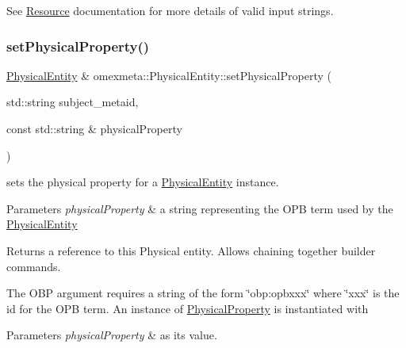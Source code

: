 See \hyperlink{classomexmeta_1_1Resource}{Resource} documentation for more details of valid input strings. \mbox{\label{classomexmeta_1_1PhysicalEntity_a5d7168c527d2dbdacd612de37aa9a605}} 
\subsubsection{\texorpdfstring{set\+Physical\+Property()}{setPhysicalProperty()}\hspace{0.1cm}{\footnotesize\ttfamily [1/2]}}
{\footnotesize\ttfamily \hyperlink{classomexmeta_1_1PhysicalEntity}{Physical\+Entity} \& omexmeta\+::\+Physical\+Entity\+::set\+Physical\+Property (\begin{DoxyParamCaption}\item[{std\+::string}]{subject\+\_\+metaid,  }\item[{const std\+::string \&}]{physical\+Property }\end{DoxyParamCaption})}



sets the physical property for a \hyperlink{classomexmeta_1_1PhysicalEntity}{Physical\+Entity} instance. 


\begin{DoxyParams}{Parameters}
{\em physical\+Property} & a string representing the O\+PB term used by the \hyperlink{classomexmeta_1_1PhysicalEntity}{Physical\+Entity} \\
\hline
\end{DoxyParams}
\begin{DoxyReturn}{Returns}
a reference to this Physical entity. Allows chaining together builder commands.
\end{DoxyReturn}
The O\+BP argument requires a string of the form \char`\"{}obp\+:opbxxx\char`\"{} where \char`\"{}xxx\char`\"{} is the id for the O\+PB term. An instance of \hyperlink{classomexmeta_1_1PhysicalProperty}{Physical\+Property} is instantiated with 
\begin{DoxyParams}{Parameters}
{\em physical\+Property} & as its value. \\
\hline
\end{DoxyParams}
\mbox{\label{classomexmeta_1_1PhysicalEntity_a9bca0cb13601b6f9617df9f264968f1f}} 
